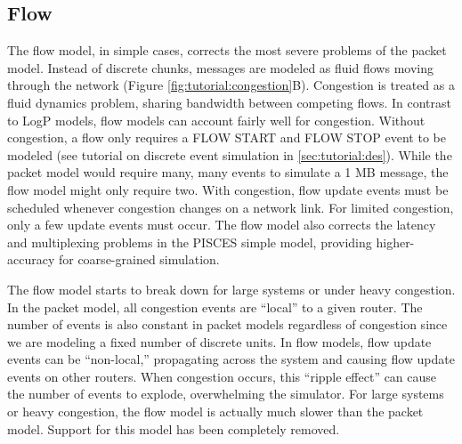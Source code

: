\subsection{Flow}
\label{subsec:tutorial:flow}
The flow model, in simple cases, corrects the most severe problems of the packet model.
Instead of discrete chunks, messages are modeled as fluid flows moving through the network (Figure \ref{fig:tutorial:congestion}B).
Congestion is treated as a fluid dynamics problem, sharing bandwidth between competing flows.
In contrast to LogP models, flow models can account fairly well for congestion.
Without congestion, a flow only requires a FLOW START and FLOW STOP event to be modeled (see tutorial on discrete event simulation in \ref{sec:tutorial:des}).
While the packet model would require many, many events to simulate a 1 MB message, the flow model might only require two.
With congestion, flow update events must be scheduled whenever congestion changes on a network link.  
For limited congestion, only a few update events must occur.
The flow model also corrects the latency and multiplexing problems in the PISCES simple model, providing higher-accuracy for coarse-grained simulation.

The flow model starts to break down for large systems or under heavy congestion.
In the packet model, all congestion events are ``local'' to a given router.  
The number of events is also constant in packet models regardless of congestion since we are modeling a fixed number of discrete units.
In flow models, flow update events can be ``non-local,'' propagating across the system and causing flow update events on other routers.
When congestion occurs, this ``ripple effect'' can cause the number of events to explode, overwhelming the simulator.
For large systems or heavy congestion, the flow model is actually much slower than the packet model. Support for this model has been completely removed.


